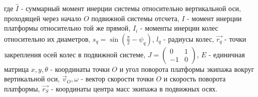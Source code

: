 где $\hat{I}$ - суммарный момент инерции системы относительно вертикальной оси, проходящей через начало $O$ подвижной системы отсчета,\newline
$I$ - момент инерции платформы относительно той же прямой,\newline
$I_i$ - моменты инерции колес относительно их диаметров,\newline
$s_q = \sin(\frac{\pi}{2} - \psi_q)$, \quad $l_q$ - радиусы колес,\newline
$\vec{r_q}$ - точки закрепления осей колес в подвижной системе,\newline
$J = \left(\begin{array}{cc}0 & 1\\-1 & 0\end{array}\right)$,
\quad $E$ - единичная матрица\newline
$x,y,\theta$ - координаты точки $O$ и угол поворота платформы экипажа вокруг вертикальной оси,\newline
$\vec{v}_O, \omega$ - вектор скорости точки $O$ и скорость поворота платформы,\newline
$\vec{r_S}$ - координаты центра масс экипажа в подвижных осях.


